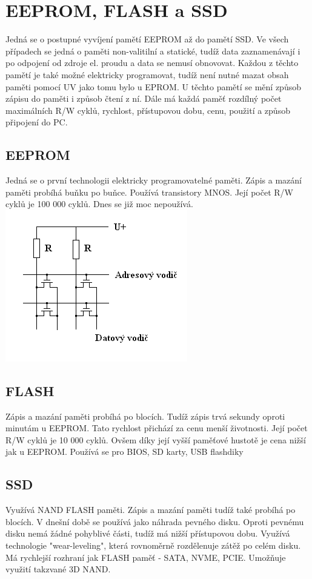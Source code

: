 \section{EEPROM, FLASH a SSD}
\label{sec:eeprom-flash-ssd}
Jedná se o postupné vyvíjení pamětí EEPROM až do pamětí SSD.
Ve všech případech se jedná o paměti non-valitilní a statické, tudíž data zaznamenávají i po odpojení od zdroje el. proudu a data se nemusí obnovovat.
Každou z těchto pamětí je také možné elektricky programovat, tudíž není nutné mazat obsah paměti pomocí UV jako tomu bylo u EPROM.
U těchto pamětí se mění způsob zápisu do paměti i způsob čtení z ní.
Dále má každá paměť rozdílný počet maximálních R/W cyklů, rychlost, přístupovou dobu, cenu, použití a způsob připojení do PC.
\subsection{EEPROM}
\begin{vwcol}[widths={0.6, 0.4}]
  Jedná se o první technologii elektricky programovatelné paměti.
  Zápis a mazání paměti probíhá buňku po buňce.
  Používá transistory MNOS.
  Její počet R/W cyklů je 100 000 cyklů.
  Dnes se již moc nepoužívá.\\
  \vspace*{-1.5cm}\includegraphics[width=0.3\linewidth]{TVY-POS/EEPROM-FLASH-SSD/EEPROM.png}
\end{vwcol}
\subsection{FLASH}
Zápis a mazání paměti probíhá po blocích.
Tudíž zápis trvá sekundy oproti minutám u EEPROM.
Tato rychlost přichází za cenu menší životnosti.
Její počet R/W cyklů je 10 000 cyklů.
Ovšem díky její vyšší paměťové hustotě je cena nižší jak u EEPROM.
Používá se pro BIOS, SD karty, USB flashdiky
\subsection{SSD}
Využívá NAND FLASH paměti.
Zápis a mazání paměti tudíž také probíhá po blocích.
V dnešní době se používá jako náhrada pevného disku.
Oproti pevnému disku nemá žádné pohyblivé části, tudíž má nižší přístupovou dobu.
Využívá technologie "wear-leveling", která rovnoměrně rozdělenuje zátěž po celém disku.
Má rychlejší rozhraní jak FLASH paměť - SATA, NVME, PCIE.
Umožňuje využití takzvané 3D NAND.
